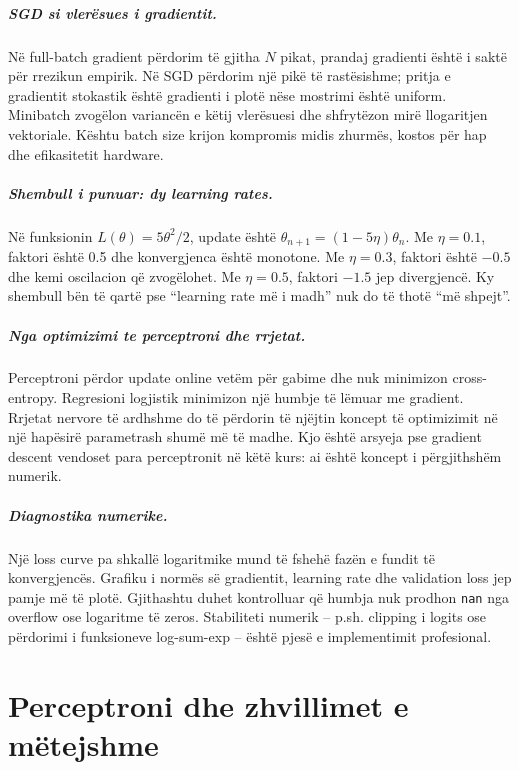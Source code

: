 \documentclass[12pt,a4paper,oneside]{book}
\begin{document}
\paragraph{SGD si vlerësues i gradientit.}
Në full-batch gradient përdorim të gjitha $N$ pikat, prandaj gradienti është i saktë për rrezikun empirik. Në SGD përdorim një pikë të rastësishme; pritja e gradientit stokastik është gradienti i plotë nëse mostrimi është uniform. Minibatch zvogëlon variancën e këtij vlerësuesi dhe shfrytëzon mirë llogaritjen vektoriale. Kështu batch size krijon kompromis midis zhurmës, kostos për hap dhe efikasitetit hardware.

\paragraph{Shembull i punuar: dy learning rates.}
Në funksionin $L(\theta)=5\theta^2/2$, update është $\theta_{n+1}=(1-5\eta)\theta_n$. Me $\eta=0.1$, faktori është 0.5 dhe konvergjenca është monotone. Me $\eta=0.3$, faktori është $-0.5$ dhe kemi oscilacion që zvogëlohet. Me $\eta=0.5$, faktori $-1.5$ jep divergjencë. Ky shembull bën të qartë pse ``learning rate më i madh'' nuk do të thotë ``më shpejt''.

\paragraph{Nga optimizimi te perceptroni dhe rrjetat.}
Perceptroni përdor update online vetëm për gabime dhe nuk minimizon cross-entropy. Regresioni logjistik minimizon një humbje të lëmuar me gradient. Rrjetat nervore të ardhshme do të përdorin të njëjtin koncept të optimizimit në një hapësirë parametrash shumë më të madhe. Kjo është arsyeja pse gradient descent vendoset para perceptronit në këtë kurs: ai është koncept i përgjithshëm numerik.

\paragraph{Diagnostika numerike.}
Një loss curve pa shkallë logaritmike mund të fshehë fazën e fundit të konvergjencës. Grafiku i normës së gradientit, learning rate dhe validation loss jep pamje më të plotë. Gjithashtu duhet kontrolluar që humbja nuk prodhon \texttt{nan} nga overflow ose logaritme të zeros. Stabiliteti numerik -- p.sh. clipping i logits ose përdorimi i funksioneve log-sum-exp -- është pjesë e implementimit profesional.

\chapter[Perceptroni]{Perceptroni dhe zhvillimet e mëtejshme}
\end{document}
